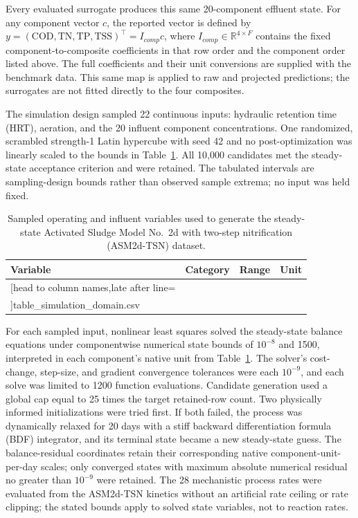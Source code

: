 \documentclass[a4paper,fleqn]{cas-sc}
\newcommand{\csvrowsfour}[1]{%
  \csvreader[head to column names,late after line=\\]{#1}{}{\colA & \colB & \colC & \colD}}
\begin{document}
Every evaluated surrogate produces this same 20-component effluent state. For any component vector $c$, the reported vector is defined by
$y=(\mathrm{COD},\mathrm{TN},\mathrm{TP},\mathrm{TSS})^\top=I_{comp}c$,
where $I_{comp}\in\mathbb{R}^{4\times F}$ contains the fixed component-to-composite coefficients in that row order and the component order listed above. The full coefficients and their unit conversions are supplied with the benchmark data. This same map is applied to raw and projected predictions; the surrogates are not fitted directly to the four composites.

The simulation design sampled 22 continuous inputs: hydraulic retention time (HRT), aeration, and the 20 influent component concentrations. One randomized, scrambled strength-1 Latin hypercube with seed 42 and no post-optimization was linearly scaled to the bounds in Table~\ref{tab:simulation_domain}. All 10,000 candidates met the steady-state acceptance criterion and were retained. The tabulated intervals are sampling-design bounds rather than observed sample extrema; no input was held fixed.

\begin{table}[htbp]
\centering
\caption{Sampled operating and influent variables used to generate the steady-state Activated Sludge Model No.\ 2d with two-step nitrification (ASM2d-TSN) dataset.}
\label{tab:simulation_domain}
\scriptsize
\setlength{\tabcolsep}{3pt}
\begin{tabular}{p{2.1cm}p{2.7cm}p{2.8cm}p{3.0cm}}
\hline
Variable & Category & Range & Unit \\
\hline
\csvrowsfour{table_simulation_domain.csv}
\hline
\end{tabular}
\end{table}

For each sampled input, nonlinear least squares solved the steady-state balance equations under componentwise numerical state bounds of $10^{-8}$ and 1500, interpreted in each component's native unit from Table~\ref{tab:simulation_domain}. The solver's cost-change, step-size, and gradient convergence tolerances were each $10^{-9}$, and each solve was limited to 1200 function evaluations. Candidate generation used a global cap equal to 25 times the target retained-row count. Two physically informed initializations were tried first. If both failed, the process was dynamically relaxed for 20 days with a stiff backward differentiation formula (BDF) integrator, and its terminal state became a new steady-state guess. The balance-residual coordinates retain their corresponding native component-unit-per-day scales; only converged states with maximum absolute numerical residual no greater than $10^{-9}$ were retained. The 28 mechanistic process rates were evaluated from the ASM2d-TSN kinetics without an artificial rate ceiling or rate clipping; the stated bounds apply to solved state variables, not to reaction rates.
\end{document}
